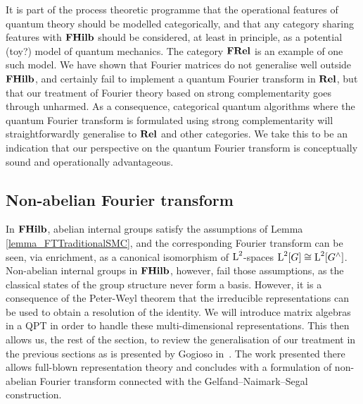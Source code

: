 It is part of the process theoretic programme that the operational features of quantum theory should be modelled categorically, and that any category sharing features with $\mathbf{FHilb}$ should be considered, at least in principle, as a potential (toy?) model of quantum mechanics. The category $\mathbf{FRel}$ is an example of one such model. We have shown that Fourier matrices do not generalise well outside $\mathbf{FHilb}$, and certainly fail to implement a quantum Fourier transform in $\mathbf{Rel}$, but that our treatment of Fourier theory based on strong complementarity goes through unharmed. As a consequence, categorical quantum algorithms where the quantum Fourier transform is formulated using strong complementarity will straightforwardly generalise to $\mathbf{Rel}$ and other categories. We take this to be an indication that our perspective on the quantum Fourier transform is conceptually sound and operationally advantageous.

\subsection{Non-abelian Fourier transform}
\label{section_NonAbelianFourierTransform}

In $\mathbf{FHilb}$, abelian internal groups satisfy the assumptions of Lemma \ref{lemma_FTTraditionalSMC}, and the corresponding Fourier transform can be seen, via enrichment, as a canonical isomorphism of $\operatorname{L}^2$-spaces $\operatorname{L}^2[G] \cong \operatorname{L}^2[G^\wedge]$. Non-abelian internal groups in $\mathbf{FHilb}$, however, fail those assumptions, as the classical states of the group structure never form a basis. However, it is a consequence of the Peter-Weyl theorem that the irreducible representations can be used to obtain a resolution of the identity. We will introduce matrix algebras in a QPT in order to handle these multi-dimensional representations. This then allows us, the rest of the section, to review the generalisation of our treatment in the previous sections as is presented by Gogioso in~\cite{gogioso2015fourier}. The work presented there allows full-blown representation theory and concludes with a formulation of non-abelian Fourier transform connected with the Gelfand--Naimark--Segal construction.

